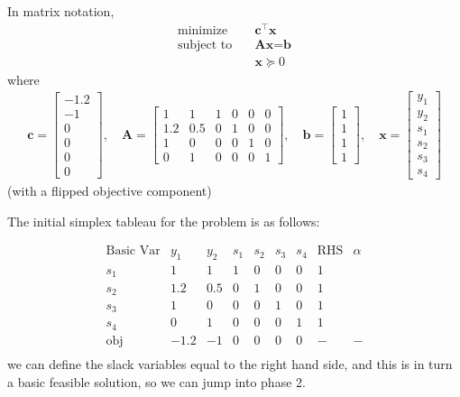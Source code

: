 \documentclass[11pt]{article}
\begin{document}
In matrix notation,
\begin{align*}
  \text{minimize} & \quad \textbf{c}^\top \textbf{x} \\
  \text{subject to} & \quad \textbf{A} \textbf{x} = \textbf{b} \\
  & \quad \textbf{x} \succeq 0
\end{align*}
where
\begin{align*}
    \textbf{c} = 
  \begin{bmatrix}
     -1.2 \\ -1 \\ 0 \\ 0 \\ 0 \\ 0
  \end{bmatrix}, \quad
  \textbf{A} = 
  \begin{bmatrix}
    1 & 1 & 1 & 0 & 0 & 0 \\
    1.2 & 0.5 & 0 & 1 & 0 & 0 \\
    1 & 0 & 0 & 0 & 1 & 0 \\
    0 & 1 & 0 & 0 & 0 & 1
  \end{bmatrix}, \quad
  \textbf{b} = 
  \begin{bmatrix}
    1 \\ 1 \\ 1 \\ 1
  \end{bmatrix}, \quad
  \textbf{x} = 
  \begin{bmatrix}
    y_1 \\ y_2 \\ s_1 \\ s_2 \\ s_3 \\ s_4
  \end{bmatrix}
\end{align*}
(with a flipped objective component)

The initial simplex tableau for the problem is as follows:

\[
\begin{array}{c|cccccc|c|c}
\text{Basic Var} & y_1 & y_2 & s_1 & s_2 & s_3 & s_4 & \text{RHS} & \alpha \\
\hline
s_1 & 1 & 1 & 1 & 0 & 0 & 0 & 1 &  \\
s_2 & 1.2 & 0.5 & 0 & 1 & 0 & 0 & 1 &  \\
s_3 & 1 & 0 & 0 & 0 & 1 & 0 & 1 &  \\
s_4 & 0 & 1 & 0 & 0 & 0 & 1 & 1 &  \\
\hline
\text{obj} & -1.2 & -1 & 0 & 0 & 0 & 0 & - & - \\
\end{array}
\]
we can define the slack variables equal to the right hand side, and this is in turn a basic feasible solution, so we can jump into phase 2.
\end{document}
